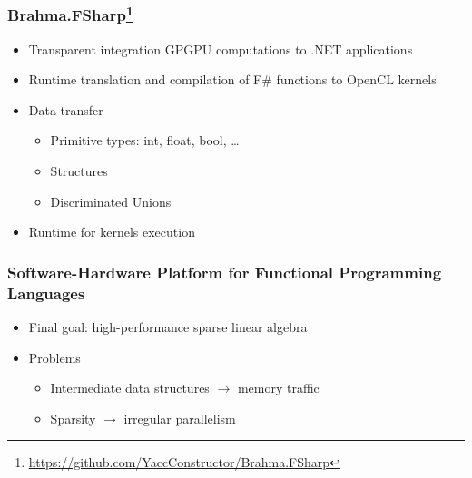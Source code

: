 \documentclass[xcolor=table,aspectratio=169]{beamer}
\begin{document}
\begin{frame}[fragile]
  \frametitle{Brahma.FSharp\footnote{\href{https://github.com/YaccConstructor/Brahma.FSharp}{https://github.com/YaccConstructor/Brahma.FSharp}}}
  \begin{itemize}
    \item Transparent integration GPGPU computations to .NET applications
    \pause
    \item Runtime translation and compilation of F\# functions to OpenCL kernels
    \item Data transfer
    \begin{itemize}
      \item Primitive types: int, float, bool, \ldots
      \item Structures
      \item Discriminated Unions
    \end{itemize}
    \item Runtime for kernels execution
  \end{itemize}
 
\end{frame}

\begin{frame}[fragile]
  \frametitle{Software-Hardware Platform for Functional Programming Languages}  
  \begin{itemize}
  \item Final goal: high-performance sparse linear algebra  
  \item Problems 
  \begin{itemize}
    \item Intermediate data structures $\to$ memory traffic
    \item Sparsity $\to$ irregular parallelism 
  \end{itemize}
  \end{itemize}
\end{frame}
\end{document}
